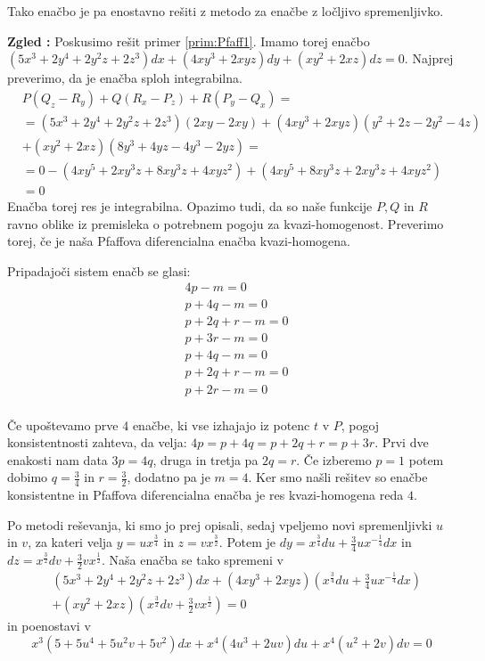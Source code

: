 \documentclass[a4paper, 10pt]{article}
\newcounter{zgledcount}
\newenvironment{zgled}{\begin{flushleft}\refstepcounter{zgledcount}\textbf{Zgled \arabic{zgledcount}:}}{\hfill\end{flushleft}}
\begin{document}
						Tako enačbo je pa enostavno rešiti z metodo za enačbe z ločljivo spremenljivko.
						
						\begin{zgled}
							Poskusimo rešit primer \ref{prim:Pfaff1}. Imamo torej enačbo $(5x^3 + 2y^4 + 2y^2z + 2z^3)dx + (4xy^3 + 2xyz)dy + (xy^2 + 2xz)dz = 0$. Najprej preverimo, da je enačba sploh integrabilna.
							\begin{align*}
								&P(Q_z - R_y) + Q(R_x - P_z) + R(P_y - Q_x) = \\
								&= (5x^3 + 2y^4 + 2y^2z + 2z^3)(2xy - 2xy)
								+ (4xy^3 + 2xyz)(y^2 + 2z - 2y^2 - 4z) \\ 
								&+ (xy^2 + 2xz)(8y^3 + 4yz - 4y^3-2yz) =\\
								&= 0 - (4xy^5 + 2xy^3z + 8xy^3z +4xyz^2) + (4xy^5 + 8xy^3z + 2xy^3z + 4xyz^2) \\ 
								&= 0
							\end{align*}
							Enačba torej res je integrabilna. Opazimo tudi, da so naše funkcije $P, Q$ in $R$ ravno oblike iz premisleka o potrebnem pogoju za kvazi-homogenost. Preverimo torej, če je naša Pfaffova diferencialna enačba kvazi-homogena.
							
							Pripadajoči sistem enačb se glasi: \begin{align*}
								&4p -m = 0 \\
								&p +4q -m = 0 \\
								&p +2q +r -m = 0 \\
								&p +3r -m = 0 \\
								&p +4q -m = 0 \\
								&p +2q +r -m = 0 \\
								&p +2r -m = 0 \\
							\end{align*}
							
							Če upoštevamo prve $4$ enačbe, ki vse izhajajo iz potenc $t$ v $P$, pogoj konsistentnosti zahteva, da velja: $4p = p+4q = p+2q+r = p+3r$. Prvi dve enakosti nam data $3p = 4q$, druga in tretja pa $2q = r$. Če izberemo $p = 1$ potem dobimo $q = \frac{3}{4}$ in $r = \frac{3}{2}$, dodatno pa je $m=4$. Ker smo našli rešitev so enačbe konsistentne in Pfaffova diferencialna enačba je res kvazi-homogena reda $4$.
							
							Po metodi reševanja, ki smo jo prej opisali, sedaj vpeljemo novi spremenljivki $u$ in $v$, za kateri velja $y = ux^{\frac{3}{4}}$ in $z = vx^{\frac{3}{2}}$. Potem je $dy = x^{\frac{3}{4}}du + \frac{3}{4}ux^{-\frac{1}{4}}dx$ in $dz = x^{\frac{3}{2}}dv + \frac{3}{2}vx^{\frac{1}{2}}$. Naša enačba se tako spremeni v \begin{align*}
								&(5x^3 + 2y^4 + 2y^2z + 2z^3)dx + (4xy^3 + 2xyz)(x^{\frac{3}{4}}du + \frac{3}{4}ux^{-\frac{1}{4}}dx) \\ &+ (xy^2 + 2xz)(x^{\frac{3}{2}}dv + \frac{3}{2}vx^{\frac{1}{2}}) = 0
							\end{align*}
							in poenostavi v $$
								x^3(5 + 5u^4 + 5u^2v + 5v^2)dx + x^4(4u^3 + 2uv)du + x^4(u^2 + 2v)dv = 0
							$$
							

\end{zgled}
\end{document}
